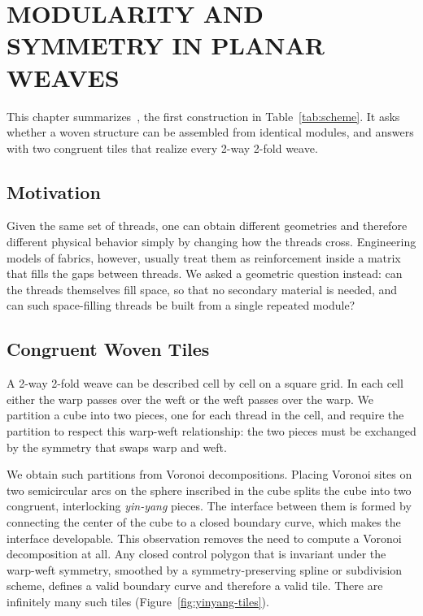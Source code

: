 %
%

\chapter{\uppercase{Modularity and Symmetry in Planar Weaves}}
\label{cha:modular-planar}

This chapter summarizes~\cite{yildiz2023modular}, the first construction in Table~\ref{tab:scheme}. It asks whether a woven structure can be assembled from identical modules, and answers with two congruent tiles that realize every 2-way 2-fold weave.

\section{Motivation}

Given the same set of threads, one can obtain different geometries and therefore different physical behavior simply by changing how the threads cross. Engineering models of fabrics, however, usually treat them as reinforcement inside a matrix that fills the gaps between threads. We asked a geometric question instead: can the threads themselves fill space, so that no secondary material is needed, and can such space-filling threads be built from a single repeated module?

\section{Congruent Woven Tiles}
\label{sec:parametric-tiles}

A 2-way 2-fold weave can be described cell by cell on a square grid. In each cell either the warp passes over the weft or the weft passes over the warp. We partition a cube into two pieces, one for each thread in the cell, and require the partition to respect this warp-weft relationship: the two pieces must be exchanged by the symmetry that swaps warp and weft.

We obtain such partitions from Voronoi decompositions. Placing Voronoi sites on two semicircular arcs on the sphere inscribed in the cube splits the cube into two congruent, interlocking \emph{yin-yang} pieces. The interface between them is formed by connecting the center of the cube to a closed boundary curve, which makes the interface developable. This observation removes the need to compute a Voronoi decomposition at all. Any closed control polygon that is invariant under the warp-weft symmetry, smoothed by a symmetry-preserving spline or subdivision scheme, defines a valid boundary curve and therefore a valid tile. There are infinitely many such tiles (Figure~\ref{fig:yinyang-tiles}).

